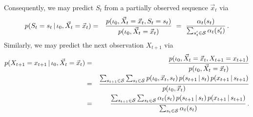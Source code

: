 \documentclass[a4paper]{article}
\begin{document}
Consequently, we may predict $S_t$ from a partially observed sequence $\vec{x}_t$ via
\begin{eqnarray}
  p(S_t=s_t\,|\,\iota_0,\vec{X}_t=\vec{x}_t) & = & \frac{p(\iota_0,\vec{X}_t=\vec{x}_t,S_t=s_t)}
     {p(\iota_0,\vec{X}_t=\vec{x}_t)}
~=~\frac{\alpha_t(s_t)}{\sum_{s_t'\in{\cal S}}\alpha_t(s_t')}\,.
\end{eqnarray}
Similarly, we may predict the next observation $X_{t+1}$ via
\begin{eqnarray}
  p(X_{t+1}=x_{t+1}\,|\,\iota_0,\vec{X}_t=\vec{x}_t) 
& = &
  \frac{p(\iota_0,\vec{X}_t=\vec{x}_t,X_{t+1}=x_{t+1})}{p(\iota_0,\vec{X}_t=\vec{x}_t)}
\nonumber\\
& = & 
 \frac{\sum_{s_{t+1}\in{\cal S}}\sum_{s_{t}\in{\cal S}}p(\iota_0,\vec{x}_t,s_t)\,p(s_{t+1}\,|\,s_t)\,p(x_{t+1}\,|\,s_{t+1})}
        {p(\iota_0,\vec{x}_t)}
\nonumber\\
& = &
  \frac{\sum_{s_{t+1}\in{\cal S}}\sum_{s_{t}\in{\cal S}}\alpha_t(s_t)\,p(s_{t+1}\,|\,s_t)\,p(x_{t+1}\,|\,s_{t+1})}{\sum_{s_t\in{\cal S}}\alpha_t(s_t)}\,.
\end{eqnarray}
\end{document}
